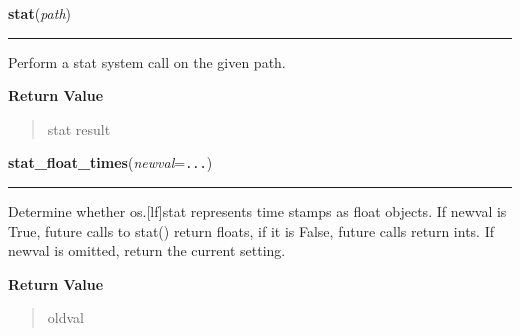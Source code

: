     \label{os:stat}

    \vspace{0.5ex}

\hspace{.8\funcindent}\begin{boxedminipage}{\funcwidth}

    \raggedright \textbf{stat}(\textit{path})

    \vspace{-1.5ex}

    \rule{\textwidth}{0.5\fboxrule}
\setlength{\parskip}{2ex}
    Perform a stat system call on the given path.

\setlength{\parskip}{1ex}
      \textbf{Return Value}
    \vspace{-1ex}

      \begin{quote}
      stat result

      \end{quote}

    \end{boxedminipage}

    \label{os:stat_float_times}

    \vspace{0.5ex}

\hspace{.8\funcindent}\begin{boxedminipage}{\funcwidth}

    \raggedright \textbf{stat\_float\_times}(\textit{newval}={\tt ...})

    \vspace{-1.5ex}

    \rule{\textwidth}{0.5\fboxrule}
\setlength{\parskip}{2ex}
    Determine whether os.[lf]stat represents time stamps as float objects. 
    If newval is True, future calls to stat() return floats, if it is 
    False, future calls return ints. If newval is omitted, return the 
    current setting.

\setlength{\parskip}{1ex}
      \textbf{Return Value}
    \vspace{-1ex}

      \begin{quote}
      oldval

      \end{quote}

    \end{boxedminipage}

